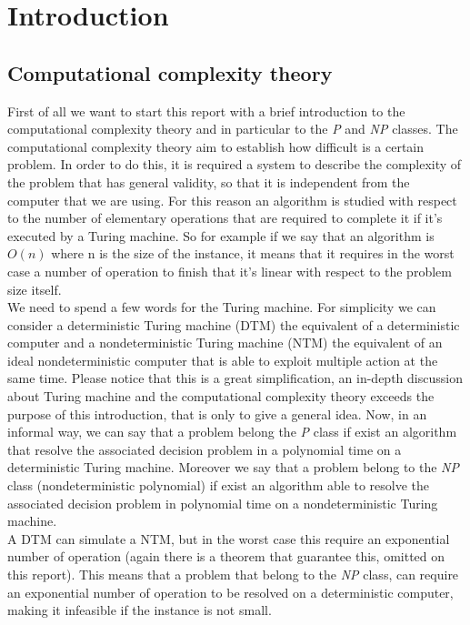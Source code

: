 \chapter{Introduction}

\section{Computational complexity theory}
First of all we want to start this report with a brief introduction to the computational complexity theory and in particular to the \textit{P} and \textit{NP}
classes. 
The computational complexity theory aim to establish how difficult is a certain problem. In order to do this, it is required a system to describe the complexity of the problem that has general validity, so that it is independent from the computer that we are using. For this reason an algorithm is studied with respect to the number of elementary operations that are required to complete it if it's executed by a Turing machine. So for example if we say that an algorithm is $O(n)$ where n is the size of the instance, it means that it requires in the worst case a number of operation to finish that it's linear with respect to the problem size itself. \\
We need to spend a few words for the Turing machine. For simplicity we can consider a deterministic Turing machine (DTM) the equivalent of a deterministic computer and a nondeterministic Turing machine (NTM) the equivalent of an ideal nondeterministic computer that is able to exploit multiple action at the same time. Please notice that this is a great simplification, an in-depth discussion about Turing machine and the computational complexity theory exceeds the purpose of this introduction, that is only to give a general idea. 
Now, in an informal way, we can say that a problem belong the \textit{P} class if exist an algorithm that resolve the associated decision problem in a polynomial time on a deterministic Turing machine. Moreover we say that a problem belong to the \textit{NP} class (nondeterministic polynomial) if exist an algorithm able to resolve the associated decision problem in polynomial time on a nondeterministic Turing machine. \\
A DTM can simulate a NTM, but in the worst case this require an exponential number of operation (again there is a theorem that guarantee this, omitted on this report). This means that a problem that belong to the \textit{NP} class, can require an exponential number of operation to be resolved on a deterministic computer, making it infeasible if the instance is not small. \\
